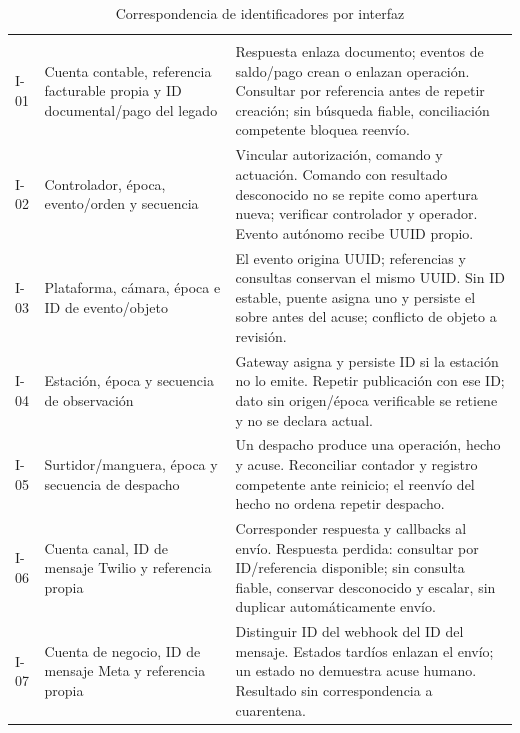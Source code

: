 \begin{longtable}{@{}L{.14\linewidth}L{.42\linewidth}L{\dimexpr.44\tabcolsep\relax}@{}}
\caption{Correspondencia de identificadores por interfaz}\label{tab:a42-correlacion}\\
\hline
{} &  & \\ \hline
\endfirsthead
\hline
{} &  & \\ \hline
\endhead
I-01 & Cuenta contable, referencia facturable propia y ID documental/pago del legado & Respuesta enlaza documento; eventos de saldo/pago crean o enlazan operación. Consultar por referencia antes de repetir creación; sin búsqueda fiable, conciliación competente bloquea reenvío.\\ \hline
I-02 & Controlador, época, evento/orden y secuencia & Vincular autorización, comando y actuación. Comando con resultado desconocido no se repite como apertura nueva; verificar controlador y operador. Evento autónomo recibe UUID propio.\\ \hline
I-03 & Plataforma, cámara, época e ID de evento/objeto & El evento origina UUID; referencias y consultas conservan el mismo UUID. Sin ID estable, puente asigna uno y persiste el sobre antes del acuse; conflicto de objeto a revisión.\\ \hline
I-04 & Estación, época y secuencia de observación & Gateway asigna y persiste ID si la estación no lo emite. Repetir publicación con ese ID; dato sin origen/época verificable se retiene y no se declara actual.\\ \hline
I-05 & Surtidor/manguera, época y secuencia de despacho & Un despacho produce una operación, hecho y acuse. Reconciliar contador y registro competente ante reinicio; el reenvío del hecho no ordena repetir despacho.\\ \hline
I-06 & Cuenta canal, ID de mensaje Twilio y referencia propia & Corresponder respuesta y callbacks al envío. Respuesta perdida: consultar por ID/referencia disponible; sin consulta fiable, conservar desconocido y escalar, sin duplicar automáticamente envío.\\ \hline
I-07 & Cuenta de negocio, ID de mensaje Meta y referencia propia & Distinguir ID del webhook del ID del mensaje. Estados tardíos enlazan el envío; un estado no demuestra acuse humano. Resultado sin correspondencia a cuarentena.\\ \hline

\end{longtable}
